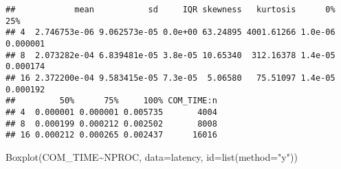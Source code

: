 \documentclass[
]{article}
\newenvironment{Shaded}{\begin{snugshade}}{\end{snugshade}}
\newcommand{\AttributeTok}[1]{\textcolor[rgb]{0.77,0.63,0.00}{#1}}
\newcommand{\CommentTok}[1]{\textcolor[rgb]{0.56,0.35,0.01}{\textit{#1}}}
\newcommand{\ConstantTok}[1]{\textcolor[rgb]{0.00,0.00,0.00}{#1}}
\newcommand{\DecValTok}[1]{\textcolor[rgb]{0.00,0.00,0.81}{#1}}
\newcommand{\FunctionTok}[1]{\textcolor[rgb]{0.00,0.00,0.00}{#1}}
\newcommand{\NormalTok}[1]{#1}
\newcommand{\OtherTok}[1]{\textcolor[rgb]{0.56,0.35,0.01}{#1}}
\newcommand{\SpecialCharTok}[1]{\textcolor[rgb]{0.00,0.00,0.00}{#1}}
\newcommand{\StringTok}[1]{\textcolor[rgb]{0.31,0.60,0.02}{#1}}
\begin{document}
\begin{Shaded}
\end{Shaded}

\begin{verbatim}
##            mean           sd     IQR skewness   kurtosis      0%      25%
## 4  2.746753e-06 9.062573e-05 0.0e+00 63.24895 4001.61266 1.0e-06 0.000001
## 8  2.073282e-04 6.839481e-05 3.8e-05 10.65340  312.16378 1.4e-05 0.000174
## 16 2.372200e-04 9.583415e-05 7.3e-05  5.06580   75.51097 1.4e-05 0.000192
##         50%      75%     100% COM_TIME:n
## 4  0.000001 0.000001 0.005735       4004
## 8  0.000199 0.000212 0.002502       8008
## 16 0.000212 0.000265 0.002437      16016
\end{verbatim}

\begin{Shaded}
\begin{Highlighting}[]
\FunctionTok{Boxplot}\NormalTok{(COM\_TIME}\SpecialCharTok{\textasciitilde{}}\NormalTok{NPROC, }\AttributeTok{data=}\NormalTok{latency, }\AttributeTok{id=}\FunctionTok{list}\NormalTok{(}\AttributeTok{method=}\StringTok{"y"}\NormalTok{))}
\end{Highlighting}
\end{Shaded}
\end{document}
